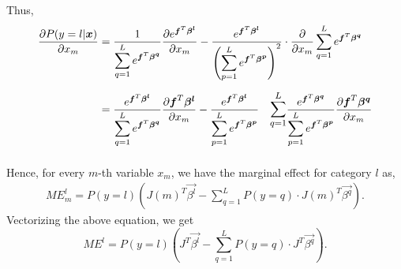 
Thus,
\begin{align*}
\displaystyle
  \pder[P(y=l|\vec{x})]{x_m} &=
        \frac{1}{\displaystyle \sum_{q=1}^{L} e^{\vec{f}^T \vec{\beta^q}}}
            \pder[e^{\vec{f}^T \vec{\beta^l}}]{x_m} -
        \frac{e^{\vec{f}^T \vec{\beta^l}} }
             {\displaystyle \left(\sum_{p=1}^{L} e^{\vec{f}^T \vec{\beta^p}}\right)^2} \cdot
            \pder{x_m} \displaystyle \sum_{q=1}^{L} e^{\vec{f}^T \vec{\beta^q}} \\[5pt]
        &= \frac{e^{\vec{f}^T \vec{\beta^l}}}
                {\displaystyle \sum_{q=1}^{L} e^{\vec{f}^T \vec{\beta^q}}} \pder[\vec{f}^T \vec{\beta^l}]{x_m} -
            \frac{ e^{\vec{f}^T \vec{\beta^l}} }
                 {\displaystyle \sum_{p=1}^{L} e^{\vec{f}^T \vec{\beta^p}} }
            \quad \displaystyle
                    \mathlarger{\sum_{q=1}^{L}}
                         \frac{ e^{\vec{f}^T \vec{\beta^q}} }
                              {\displaystyle \sum_{p=1}^{L} e^{\vec{f}^T \vec{\beta^p}}}
                         \pder[\vec{f}^T \vec{\beta^q}]{x_m} \\[5pt]
 \end{align*}

Hence, for every $m$-th variable $x_m$, we have the marginal effect for category
$l$ as,
\begin{gather*}
    \mathit{ME}_m^l =  P(y=l)\left(\displaystyle J(m)^T \vec{\beta^l} -
                     \sum_{q=1}^{L} P(y=q) \cdot J(m)^T \vec{\beta^q}  \right).
\end{gather*}
Vectorizing the above equation, we get
 $$
 \mathit{ME}^l =
 P(y=l)\left(\displaystyle J^T \vec{\beta^l} -
     \sum_{q=1}^{L} P(y=q) \cdot J^T \vec{\beta^q} \right).
 $$

